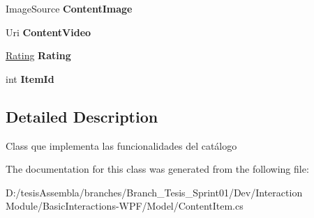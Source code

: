 \begin{DoxyCompactItemize}
\item 
\hypertarget{class_microsoft_1_1_samples_1_1_kinect_1_1_basic_interactions_1_1_content_item_acf56296ef3b2a6f1c1d0fed57f891f0f}{Image\-Source {\bfseries Content\-Image}}\label{class_microsoft_1_1_samples_1_1_kinect_1_1_basic_interactions_1_1_content_item_acf56296ef3b2a6f1c1d0fed57f891f0f}

\item 
\hypertarget{class_microsoft_1_1_samples_1_1_kinect_1_1_basic_interactions_1_1_content_item_aa43580a98215e52e37de3c1802b3e2c2}{Uri {\bfseries Content\-Video}}\label{class_microsoft_1_1_samples_1_1_kinect_1_1_basic_interactions_1_1_content_item_aa43580a98215e52e37de3c1802b3e2c2}

\item 
\hypertarget{class_microsoft_1_1_samples_1_1_kinect_1_1_basic_interactions_1_1_content_item_a626d2b827954ed2f7be262fbc8fd51fd}{\hyperlink{class_microsoft_1_1_samples_1_1_kinect_1_1_basic_interactions_1_1_rating}{Rating} {\bfseries Rating}}\label{class_microsoft_1_1_samples_1_1_kinect_1_1_basic_interactions_1_1_content_item_a626d2b827954ed2f7be262fbc8fd51fd}

\item 
\hypertarget{class_microsoft_1_1_samples_1_1_kinect_1_1_basic_interactions_1_1_content_item_a73cc6d8e8fe509e2cf046ad1356c6bfc}{int {\bfseries Item\-Id}}\label{class_microsoft_1_1_samples_1_1_kinect_1_1_basic_interactions_1_1_content_item_a73cc6d8e8fe509e2cf046ad1356c6bfc}

\end{DoxyCompactItemize}


\subsection{Detailed Description}
Class que implementa las funcionalidades del catálogo 

The documentation for this class was generated from the following file\-:\begin{DoxyCompactItemize}
\item 
D\-:/tesis\-Assembla/branches/\-Branch\-\_\-\-Tesis\-\_\-\-Sprint01/\-Dev/\-Interaction Module/\-Basic\-Interactions-\/\-W\-P\-F/\-Model/Content\-Item.\-cs\end{DoxyCompactItemize}
